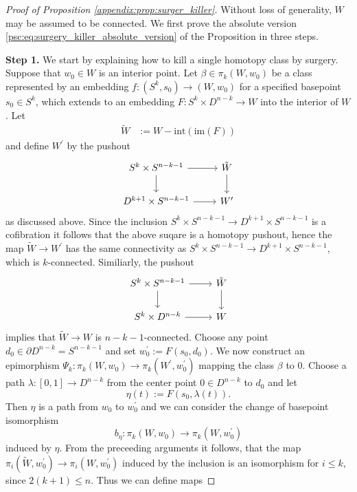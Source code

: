 \begin{proof}[Proof of Proposition \ref{appendix:prop:surger_killer}]
    Without loss of generality, $W$ may be assumed to be connected. We first prove the absolute version \ref{psc:eq:surgery_killer_absolute_version} of the Proposition in three steps.

    \noindent \textbf{Step 1.} We start by explaining how to kill a single homotopy class by surgery. Suppose that $w_0 \in W$ is an interior point. Let $\beta \in \pi_k(W,w_0)$ be a class represented by an embedding $f \colon (S^k,s_0) \to (W,w_0)$ for a specified basepoint $s_0 \in S^k$, which extends to an embedding $F \colon S^k \times D^{n-k} \to W$ into the interior of $W$. Let 
    \begin{align*}
        \tilde{W} &:= W - \mathrm{int}(\mathrm{im}(F))
    \end{align*}
    and define $W^\prime$ by the pushout
    \[\begin{tikzcd}
	{S^k \times S^{n-k-1}} & {\tilde{W}} \\
	{D^{k+1} \times S^{n-k-1}} & {W^\prime}
	\arrow[from=1-1, to=1-2]
	\arrow[from=1-1, to=2-1]
	\arrow[from=1-2, to=2-2]
	\arrow[from=2-1, to=2-2]
    \end{tikzcd}\]
    as discussed above. Since the inclusion $S^k \times S^{n-k-1} \to D^{k+1} \times S^{n-k-1}$ is a cofibration it follows that the above suqare is a homotopy pushout, hence the map $\tilde{W} \to W^\prime$ has the same connectivity as $S^k \times S^{n-k-1} \to D^{k+1} \times S^{n-k-1}$, which is $k$-connected. Similiarly, the pushout 
    \[\begin{tikzcd}
	{S^k \times S^{n-k-1}} & {\tilde{W}} \\
	{S^k \times D^{n-k}} & W
	\arrow[from=1-1, to=1-2]
	\arrow[from=1-1, to=2-1]
	\arrow[from=1-2, to=2-2]
	\arrow[from=2-1, to=2-2]
    \end{tikzcd}\]
    implies that $\tilde{W} \to W$ is $n-k-1$-connected. Choose any point $d_0 \in \partial D^{n-k} = S^{n-k-1}$ and set $w_0^\prime := F(s_0,d_0)$. We now construct an epimorphism $\Psi_k \colon \pi_k(W,w_0) \to \pi_k(W^\prime,w_0^\prime)$ mapping the class $\beta$ to $0$. Choose a path $\lambda \colon [0,1] \to D^{n-k}$ from the center point $0 \in D^{n-k}$ to $d_0$ and let
    \[
    \eta(t) := F(s_0,\lambda(t)).
    \]
    Then $\eta$ is a path from $w_0$ to $w_0^\prime$ and we can consider the change of basepoint isomorphism
    \[
    b_\eta \colon \pi_k(W,w_0) \to \pi_k(W,w_0^\prime)
    \]
    induced by $\eta$. From the preceeding arguments it follows, that the map $\pi_i(\tilde{W},w_0^\prime) \to \pi_i(W,w_0^\prime)$ induced by the inclusion is an isomorphism for $i \leq k$, since $2(k+1) \leq n$. Thus we can define maps

\end{proof}
